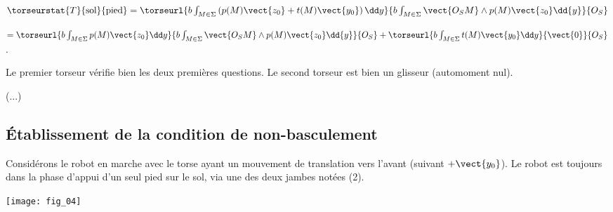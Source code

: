\else
\fi



\ifprof
\begin{corrige}
$
\torseurstat{T}{\text{sol}}{\text{pied}}=\torseurl{b\int_{M\in\Sigma}\left(p(M)\vect{z_0}+t(M)\vect{y_0}\right) \dd y }{b\int_{M\in\Sigma} \vect{O_S M} \wedge p(M)\vect{z_0} \dd {y}}{O_S}$

$=\torseurl{b\int_{M\in\Sigma}p(M)\vect{z_0}\dd y }{b\int_{M\in\Sigma} \vect{O_S M} \wedge p(M)\vect{z_0} \dd {y}}{O_S}+\torseurl{b\int_{M\in\Sigma}t(M)\vect{y_0}\dd y }{\vect{0}}{O_S}$.

Le premier torseur vérifie bien les deux premières questions. Le second torseur est bien un glisseur (automoment nul). 

(...)


\end{corrige}
\else
\fi

\subsection*{Établissement de la condition de non-basculement}
\ifprof
\else

Considérons le robot en marche avec le torse ayant un mouvement de
translation vers l’avant (suivant $+\vect{y_0}$). Le robot est toujours dans la
phase d'appui d'un seul pied sur le sol, via une des deux jambes notées
(2).


\begin{marginfigure}[-2cm]
\texttt{[image: fig\_04]}
\end{marginfigure}

